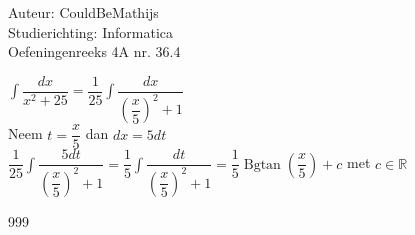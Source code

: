 \documentclass[a4paper]{article}
\newcommand{\intt}{\displaystyle\int}
\begin{document}
  
\noindent \large Auteur: CouldBeMathijs \\
\noindent \large Studierichting: Informatica\\
\noindent \large Oefeningenreeks 4A nr. 36.4\\

\medskip

\normalsize

$\intt \dfrac{dx}{x^2 + 25} = \dfrac{1}{25} \intt \dfrac{dx}{\left(\dfrac{x}{5}\right)^2 + 1}$\\

Neem $t = \dfrac{x}{5}$ dan $dx = 5dt$\\

$\dfrac{1}{25} \intt \dfrac{5dt}{\left(\dfrac{x}{5}\right)^2 + 1} = \dfrac{1}{5} \intt \dfrac{dt}{\left(\dfrac{x}{5}\right)^2 + 1} = \dfrac{1}{5}\operatorname{Bgtan}\left(\dfrac{x}{5}\right) + c$ met $c \in \mathbb{R}$\\

\begin{thebibliography}{999}
\end{thebibliography}
\end{document}
